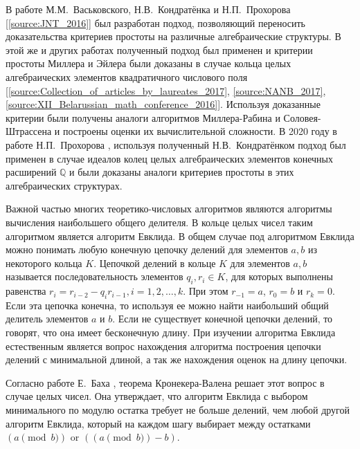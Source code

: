 \documentclass[_00_dissertation.tex]{subfiles}
\begin{document}
В работе М.М.~Васьковского, Н.В.~Кондратёнка и Н.П.~Прохорова [\ref{source:JNT_2016}] был разработан подход, позволяющий переносить доказательства критериев простоты на различные алгебраические структуры.
В этой же и других работах полученный подход был применен и критерии простоты Миллера и Эйлера были доказаны в случае кольца целых алгебраических элементов квадратичного числового поля [\ref{source:Collection_of_articles_by_laureates_2017}, \ref{source:NANB_2017}, \ref{source:XII_Belarussian_math_conference_2016}].
Используя доказанные критерии были получены аналоги алгоритмов Миллера-Рабина и Соловея-Штрассена и построены оценки их вычислительной сложности.
В 2020 году в работе Н.П.~Прохорова \cite{source:Prochorov}, используя полученный Н.В.~Кондратёнком подход был применен в случае идеалов колец целых алгебраических элементов конечных расширений $\mathbb{Q}$ и были доказаны аналоги критериев простоты в этих алгебраических структурах.


Важной частью многих теоретико-числовых алгоритмов являются алгоритмы вычисления наибольшего общего делителя.
В кольце целых чисел таким алгоритмом является алгоритм Евклида.
В общем случае под алгоритмом Евклида можно понимать любую конечную цепочку делений для элементов $a, b$ из некоторого кольца $K$.
Цепочкой делений в кольце $K$ для элементов $a, b$ называется последовательность элементов $q_i, r_i \in K$, для которых выполнены равенства $r_i=r_{i-2}-q_i r_{i-1}, i = 1, 2, \ldots, k$.
При этом $r_{-1} = a$, $r_0 = b$ и $r_k=0$.
Если эта цепочка конечна, то используя ее можно найти наибольший общий делитель элементов $a$ и $b$.
Если не существует конечной цепочки делений, то говорят, что она имеет бесконечную длину.
При изучении алгоритма Евклида естественным является вопрос нахождения алгоритма построения цепочки делений с минимальной длиной, а так же нахождения оценок на длину цепочки.

Согласно работе Е.~Баха \cite{source:Bach_Algorithmic_number_theory}, теорема Кронекера-Валена решает этот вопрос в случае целых чисел.
Она утверждает, что алгоритм Евклида с выбором минимального по модулю остатка требует не больше делений, чем любой другой алгоритм Евклида, который на каждом шагу выбирает между остатками $(a\pmod{b})$ or $((a\pmod{b})-b)$.
\end{document}
